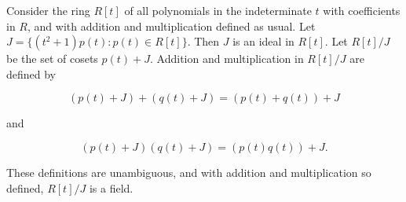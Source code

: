 Consider the ring $R[t]$ of all polynomials in the indeterminate $t$ with coefficients in $R$, and with addition and multiplication defined as usual. Let $J = \{(t^2 + 1) p(t) : p(t) \in R[t]\}$. Then $J$ is an ideal in $R[t]$. Let $R[t]/J$ be the set of cosets $p(t) + J$. Addition and multiplication in $R[t]/J$ are defined by

$$(p(t) + J) + (q(t) + J) = (p(t) + q(t)) + J$$

and

$$(p(t) + J) (q(t) + J) = (p(t) q(t)) + J.$$

These definitions are unambiguous, and with addition and multiplication so defined, $R[t]/J$ is a field.
